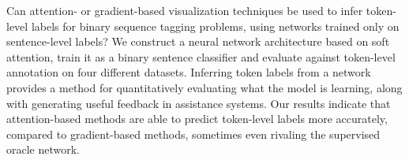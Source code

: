 Can attention- or gradient-based visualization techniques be used to infer token-level labels for binary sequence tagging problems, using networks trained only on sentence-level labels? We construct a neural network architecture based on soft attention, train it as a binary sentence classifier and evaluate against token-level annotation on four different datasets. Inferring token labels from a network provides a method for quantitatively evaluating what the model is learning, along with generating useful feedback in assistance systems. Our results indicate that attention-based methods are able to predict token-level labels more accurately, compared to gradient-based methods, sometimes even rivaling the supervised oracle network.
